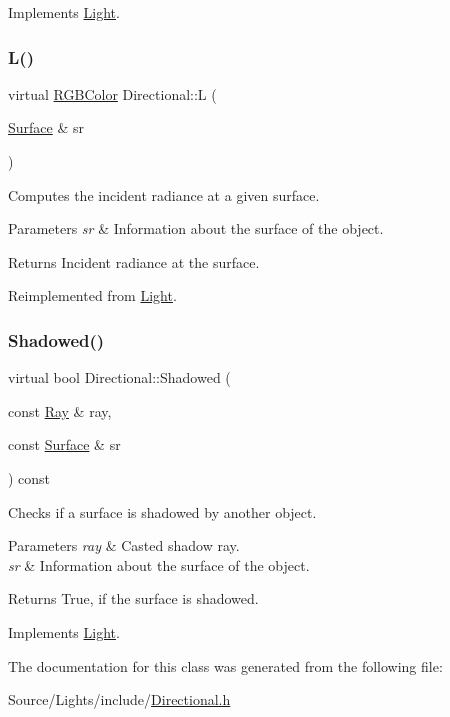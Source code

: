 Implements \hyperlink{class_light_a62c5f73131ca1cdd6b2477f36c242482}{Light}.

\hypertarget{class_directional_ac9a728a89d32c5f62ddef2be6c3e467d}{}\label{class_directional_ac9a728a89d32c5f62ddef2be6c3e467d} 
\subsubsection{\texorpdfstring{L()}{L()}}
{\footnotesize\ttfamily virtual \hyperlink{class_r_g_b_color}{R\+G\+B\+Color} Directional\+::L (\begin{DoxyParamCaption}\item[{\hyperlink{class_surface}{Surface} \&}]{sr }\end{DoxyParamCaption})\hspace{0.3cm}{\ttfamily [virtual]}}

Computes the incident radiance at a given surface. 
\begin{DoxyParams}{Parameters}
{\em sr} & Information about the surface of the object. \\
\hline
\end{DoxyParams}
\begin{DoxyReturn}{Returns}
Incident radiance at the surface. 
\end{DoxyReturn}


Reimplemented from \hyperlink{class_light_aba4ca1dcd52876cb5bee71ac8f684af5}{Light}.

\hypertarget{class_directional_a56a42abcdb41df1e3dd44b173aee494a}{}\label{class_directional_a56a42abcdb41df1e3dd44b173aee494a} 
\subsubsection{\texorpdfstring{Shadowed()}{Shadowed()}}
{\footnotesize\ttfamily virtual bool Directional\+::\+Shadowed (\begin{DoxyParamCaption}\item[{const \hyperlink{class_ray}{Ray} \&}]{ray,  }\item[{const \hyperlink{class_surface}{Surface} \&}]{sr }\end{DoxyParamCaption}) const\hspace{0.3cm}{\ttfamily [virtual]}}

Checks if a surface is shadowed by another object. 
\begin{DoxyParams}{Parameters}
{\em ray} & Casted shadow ray. \\
\hline
{\em sr} & Information about the surface of the object. \\
\hline
\end{DoxyParams}
\begin{DoxyReturn}{Returns}
True, if the surface is shadowed. 
\end{DoxyReturn}


Implements \hyperlink{class_light_ac96c5efcdccb339609c7d19ea6ac5d17}{Light}.



The documentation for this class was generated from the following file\+:\begin{DoxyCompactItemize}
\item 
Source/\+Lights/include/\hyperlink{_directional_8h}{Directional.\+h}\end{DoxyCompactItemize}
